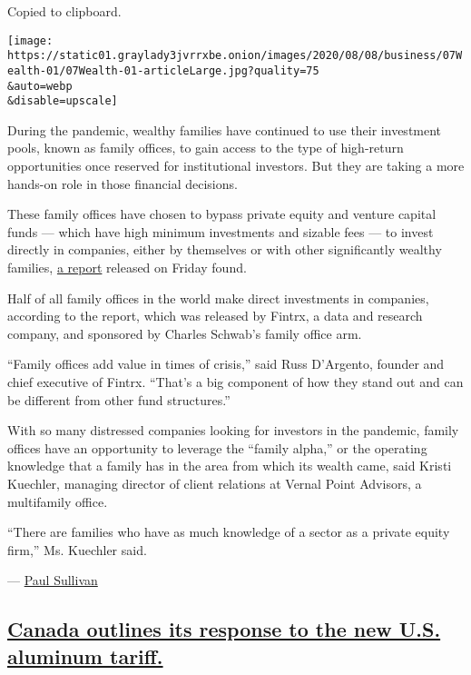 Copied to clipboard.

\texttt{[image: https://static01.graylady3jvrrxbe.onion/images/2020/08/08/business/07Wealth-01/07Wealth-01-articleLarge.jpg?quality=75\\\&auto=webp\\\&disable=upscale]}

During the pandemic, wealthy families have continued to use their
investment pools, known as family offices, to gain access to the type of
high-return opportunities once reserved for institutional investors. But
they are taking a more hands-on role in those financial decisions.

These family offices have chosen to bypass private equity and venture
capital funds --- which have high minimum investments and sizable fees
--- to invest directly in companies, either by themselves or with other
significantly wealthy families,
\href{https://www.fintrx.com/fintrx-charles-schwab-2020-family-office-report}{a
report} released on Friday found.

Half of all family offices in the world make direct investments in
companies, according to the report, which was released by Fintrx, a data
and research company, and sponsored by Charles Schwab's family office
arm.

``Family offices add value in times of crisis,'' said Russ D'Argento,
founder and chief executive of Fintrx. ``That's a big component of how
they stand out and can be different from other fund structures.''

With so many distressed companies looking for investors in the pandemic,
family offices have an opportunity to leverage the ``family alpha,'' or
the operating knowledge that a family has in the area from which its
wealth came, said Kristi Kuechler, managing director of client relations
at Vernal Point Advisors, a multifamily office.

``There are families who have as much knowledge of a sector as a private
equity firm,'' Ms. Kuechler said.

--- \href{https://www.nytimes3xbfgragh.onion/by/paul-sullivan}{Paul
Sullivan}

\hypertarget{canada-outlines-its-response-to-the-new-us-aluminum-tariff}{%
\subsection{\texorpdfstring{\protect\hyperlink{canada-outlines-its-response-to-the-new-us-aluminum-tariff}{Canada
outlines its response to the new U.S. aluminum
tariff.}}{Canada outlines its response to the new U.S. aluminum tariff.}}\label{canada-outlines-its-response-to-the-new-us-aluminum-tariff}}

